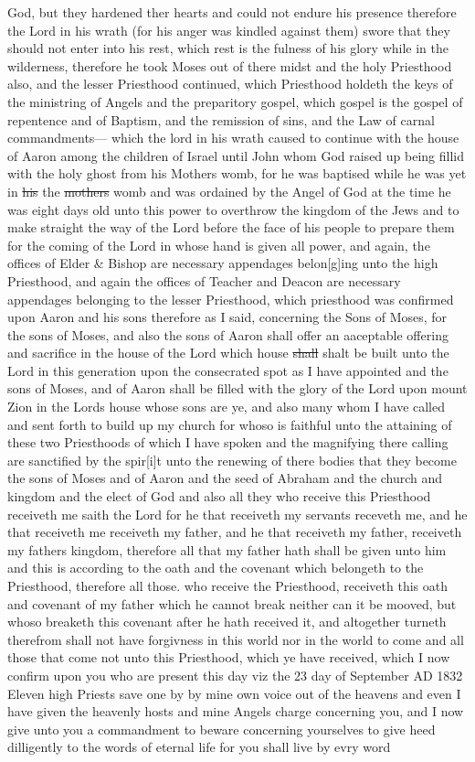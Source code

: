 God, but they hardened ther hearts and could not endure his presence therefore the Lord in his wrath (for his anger was kindled against them) swore that they should not enter into his rest, which rest is the fulness of his glory while in the wilderness, therefore he took Moses out of there midst and the holy Priesthood also, and the lesser Priesthood continued, which Priesthood holdeth the keys of the ministring of Angels and the preparitory gospel, which gospel is the gospel of repentence and of Baptism, and the remission of sins, and the Law of carnal commandments--- which the lord in his wrath caused to continue with the house of Aaron among the children of Israel until John whom God raised up being fillid with the holy ghost from his Mothers womb, for he was baptised while he was yet in \sout{his} the \sout{mothers} womb and was ordained by the Angel of God at the time he was eight days old unto this power to overthrow the kingdom of the Jews and to make straight the way of the Lord before the face of his people to prepare them for the coming of the Lord in whose hand is given all power, and again, the offices of Elder \& Bishop are necessary appendages belon[g]ing unto the high Priesthood, and again the offices of Teacher and Deacon are necessary appendages belonging to the lesser Priesthood, which priesthood was confirmed upon Aaron and his sons therefore as I said, concerning the Sons of Moses, for the sons of Moses, and also the sons of Aaron shall offer an aaceptable offering and sacrifice in the house of the Lord which house \sout{shall} shalt be built unto the Lord in this generation upon the consecrated spot as I have appointed and the sons of Moses, and of Aaron shall be filled with the glory of the Lord upon mount Zion in the Lords house whose sons are ye, and also many whom I have called and sent forth to build up my church for whoso is faithful unto the attaining of these two Priesthoods of which I have spoken and the magnifying there calling are sanctified by the spir[i]t unto the renewing of there bodies that they become the sons of Moses and of Aaron and the seed of Abraham and the church and kingdom and the elect of God and also all they who receive this Priesthood receiveth me saith the Lord for he that receiveth my servants receveth me, and he that receiveth me receiveth my father, and he that receiveth my father, receiveth my fathers kingdom, therefore all that my father hath shall be given unto him and this is according to the oath and the covenant which belongeth to the Priesthood, therefore all those. who receive the Priesthood, receiveth this oath and covenant of my father which he cannot break neither can it be mooved, but whoso breaketh this covenant after he hath received it, and altogether turneth therefrom shall not have forgivness in this world nor in the world to come and all those that come not unto this Priesthood, which ye have received, which I now confirm upon you who are present this day viz the 23 day of September AD 1832 Eleven high Priests save one by by mine own voice out of the heavens and even I have given the heavenly hosts and mine Angels charge concerning you, and I now give unto you a commandment to beware concerning yourselves to give heed dilligently to the words of eternal life for you shall live by evry word 